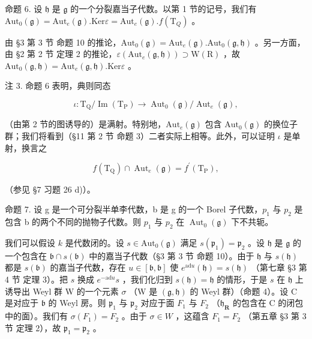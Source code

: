 命题 6. 设 \(\mathfrak{h}\) 是 \(\mathfrak{g}\) 的一个分裂嘉当子代数。以第 1 节的记号，我们有 \(\mathrm{Aut}_0(\mathfrak{g}) = \mathrm{Aut}_e(\mathfrak{g}).\mathrm{Ker}\varepsilon = \mathrm{Aut}_e(\mathfrak{g}).f(\mathrm{T}_Q)\) 。

由 §3 第 3 节 命题 10 的推论，\(\mathrm{Aut}_0(\mathfrak{g}) = \mathrm{Aut}_e(\mathfrak{g}).\mathrm{Aut}_0(\mathfrak{g},\mathfrak{h})\) 。另一方面，由 §2 第 2 节 定理 2 的推论，\(\varepsilon (\mathrm{Aut}_e(\mathfrak{g},\mathfrak{h}))\supset \mathrm{W}(\mathrm{R})\) ，故 \(\mathrm{Aut}_0(\mathfrak{g},\mathfrak{h}) = \mathrm{Aut}_e(\mathfrak{g},\mathfrak{h}).\mathrm{Ker}\varepsilon\) 。

注 3. 命题 6 表明，典则同态

\[
\iota : \mathrm{T} _ {\mathrm{Q}} / \operatorname{Im} (\mathrm{T} _ {\mathrm{P}}) \to \operatorname{Aut} _ {0} (\mathfrak {g}) / \operatorname{Aut} _ {e} (\mathfrak {g}),
\]

（由第 2 节的图诱导的）是满射。特别地，\(\mathrm{Aut}_e(\mathfrak{g})\) 包含 \(\mathrm{Aut}_0(\mathfrak{g})\) 的换位子群；我们将看到（§11 第 2 节 命题 3）二者实际上相等。此外，可以证明 \(\iota\) 是单射，换言之

\[
f (\mathrm{T} _ {\mathrm{Q}}) \cap \operatorname{Aut} _ {e} (\mathfrak {g}) = f ^ {\prime} (\mathrm{T} _ {\mathrm{P}}),
\]

（参见 §7 习题 26 d)）。

命题 7. 设 g 是一个可分裂半单李代数，b 是 g 的一个 Borel 子代数，\(p_{1}\) 与 \(p_{2}\) 是包含 b 的两个不同的抛物子代数。则 \(p_{1}\) 与 \(p_{2}\) 在 \(\operatorname{Aut}_{0}(\mathfrak{g})\) 下不共轭。

我们可以假设 \(k\) 是代数闭的。设 \(s \in \mathrm{Aut}_0(\mathfrak{g})\) 满足 \(s(\mathfrak{p}_1) = \mathfrak{p}_2\) 。设 \(\mathfrak{h}\) 是 \(\mathfrak{g}\) 的一个包含在 \(\mathfrak{b} \cap s(\mathfrak{b})\) 中的嘉当子代数（§3 第 3 节 命题 10）。由于 \(\mathfrak{h}\) 与 \(s(\mathfrak{h})\) 都是 \(s(\mathfrak{b})\) 的嘉当子代数，存在 \(u \in [\mathfrak{b}, \mathfrak{b}]\) 使 \(e^{\mathrm{ad}u}(\mathfrak{h}) = s(\mathfrak{h})\) （第七章 §3 第 4 节 定理 3）。把 \(s\) 换成 \(e^{-\mathrm{ad}u}s\) ，我们化归到 \(s(\mathfrak{h}) = \mathfrak{h}\) 的情形，于是 \(s\) 在 \(\mathfrak{h}\) 上诱导出 Weyl 群 W 的一个元素 \(\sigma\) （W 是 \((\mathfrak{g}, \mathfrak{h})\) 的 Weyl 群）（命题 4）。设 C 是对应于 \(\mathfrak{b}\) 的 Weyl 房。则 \(\mathfrak{p}_1\) 与 \(\mathfrak{p}_2\) 对应于面 \(F_1\) 与 \(F_2\) （\(\mathfrak{h}_{\mathbf{R}}\) 的包含在 C 的闭包中的面）。我们有 \(\sigma(F_1) = F_2\) 。由于 \(\sigma \in W\) ，这蕴含 \(F_1 = F_2\) （第五章 §3 第 3 节 定理 2），故 \(\mathfrak{p}_1 = \mathfrak{p}_2\) 。

